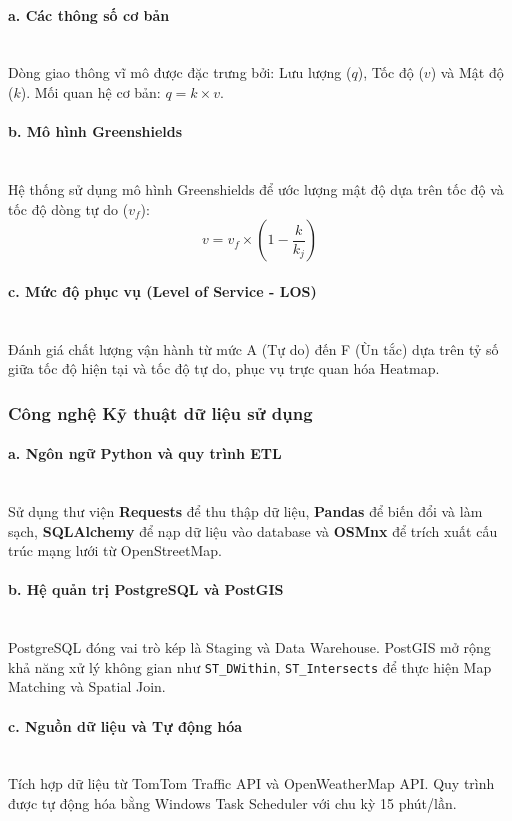 \paragraph{a. Các thông số cơ bản} \mbox{} \\
Dòng giao thông vĩ mô được đặc trưng bởi: Lưu lượng ($q$), Tốc độ ($v$) và Mật độ ($k$). Mối quan hệ cơ bản: $q = k \times v$.

\paragraph{b. Mô hình Greenshields} \mbox{} \\
Hệ thống sử dụng mô hình Greenshields để ước lượng mật độ dựa trên tốc độ và tốc độ dòng tự do ($v_f$):
$$v = v_f \times \left(1 - \frac{k}{k_j}\right)$$

\paragraph{c. Mức độ phục vụ (Level of Service - LOS)} \mbox{} \\
Đánh giá chất lượng vận hành từ mức A (Tự do) đến F (Ùn tắc) dựa trên tỷ số giữa tốc độ hiện tại và tốc độ tự do, phục vụ trực quan hóa Heatmap.

\subsubsection{Công nghệ Kỹ thuật dữ liệu sử dụng}

\paragraph{a. Ngôn ngữ Python và quy trình ETL} \mbox{} \\
Sử dụng thư viện \textbf{Requests} để thu thập dữ liệu, \textbf{Pandas} để biến đổi và làm sạch, \textbf{SQLAlchemy} để nạp dữ liệu vào database và \textbf{OSMnx} để trích xuất cấu trúc mạng lưới từ OpenStreetMap.

\paragraph{b. Hệ quản trị PostgreSQL và PostGIS} \mbox{} \\
PostgreSQL đóng vai trò kép là Staging và Data Warehouse. PostGIS mở rộng khả năng xử lý không gian như \texttt{ST\_DWithin}, \texttt{ST\_Intersects} để thực hiện Map Matching và Spatial Join.

\paragraph{c. Nguồn dữ liệu và Tự động hóa} \mbox{} \\
Tích hợp dữ liệu từ TomTom Traffic API và OpenWeatherMap API. Quy trình được tự động hóa bằng Windows Task Scheduler với chu kỳ 15 phút/lần.
